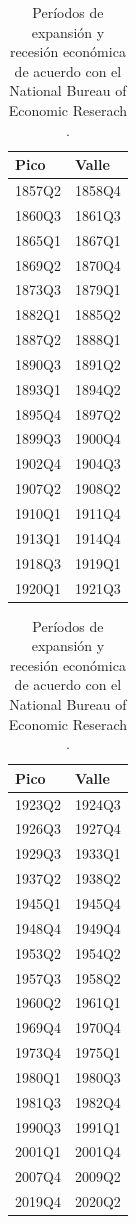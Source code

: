 \documentclass[titlepage, 12pt]{article}
\begin{document}
\begin{table}
    \centering
    \begin{tabular}{ll}
        \toprule
        Pico   & Valle  \\
        \midrule
        1857Q2 & 1858Q4 \\
        1860Q3 & 1861Q3 \\
        1865Q1 & 1867Q1 \\
        1869Q2 & 1870Q4 \\
        1873Q3 & 1879Q1 \\
        1882Q1 & 1885Q2 \\
        1887Q2 & 1888Q1 \\
        1890Q3 & 1891Q2 \\
        1893Q1 & 1894Q2 \\
        1895Q4 & 1897Q2 \\
        1899Q3 & 1900Q4 \\
        1902Q4 & 1904Q3 \\
        1907Q2 & 1908Q2 \\
        1910Q1 & 1911Q4 \\
        1913Q1 & 1914Q4 \\
        1918Q3 & 1919Q1 \\
        1920Q1 & 1921Q3 \\
        \bottomrule
    \end{tabular}
    \begin{tabular}{ll}
        \toprule
        Pico   & Valle  \\
        \midrule
        1923Q2 & 1924Q3 \\
        1926Q3 & 1927Q4 \\
        1929Q3 & 1933Q1 \\
        1937Q2 & 1938Q2 \\
        1945Q1 & 1945Q4 \\
        1948Q4 & 1949Q4 \\
        1953Q2 & 1954Q2 \\
        1957Q3 & 1958Q2 \\
        1960Q2 & 1961Q1 \\
        1969Q4 & 1970Q4 \\
        1973Q4 & 1975Q1 \\
        1980Q1 & 1980Q3 \\
        1981Q3 & 1982Q4 \\
        1990Q3 & 1991Q1 \\
        2001Q1 & 2001Q4 \\
        2007Q4 & 2009Q2 \\
        2019Q4 & 2020Q2 \\
        \bottomrule
    \end{tabular}
    \caption{Períodos de expansión y recesión económica de acuerdo con el National Bureau of Economic Reserach \autocite{nber2023}.}
\end{table}
\end{document}
